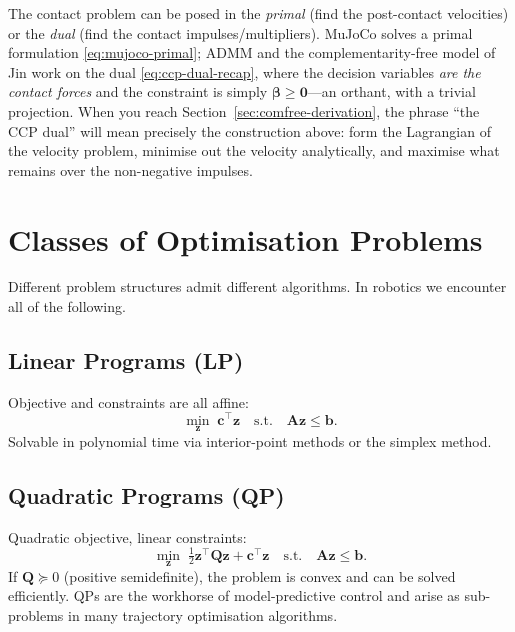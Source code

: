 \documentclass[11pt,twoside]{report}
\theoremstyle{definition}
\theoremstyle{plain}
\theoremstyle{remark}
\newcommand{\0}{\bm{0}}
\begin{document}
\begin{insightbox}
The contact problem can be posed in the \emph{primal} (find the
post-contact velocities) or the \emph{dual} (find the contact
impulses/multipliers). MuJoCo solves a primal formulation
\eqref{eq:mujoco-primal}; ADMM and the complementarity-free model of
Jin work on the dual \eqref{eq:ccp-dual-recap}, where the decision
variables \emph{are the contact forces} and the constraint is simply
$\bm{\beta}\ge\0$---an orthant, with a trivial projection.
When you reach Section~\ref{sec:comfree-derivation}, the phrase
``the CCP dual'' will mean precisely the construction above: form the
Lagrangian of the velocity problem, minimise out the velocity
analytically, and maximise what remains over the non-negative impulses.
\end{insightbox}

\section{Classes of Optimisation Problems}
\label{sec:opt-classes}

Different problem structures admit different algorithms.  In robotics we encounter all of the following.

\subsection{Linear Programs (LP)}
Objective and constraints are all affine:
\begin{equation}
\min_{\bm{z}}\;\bm{c}^{\!\top}\bm{z}\quad\text{s.t.}\quad
\bm{A}\bm{z}\le\bm{b}.
\end{equation}
Solvable in polynomial time via interior-point methods or the simplex method.

\subsection{Quadratic Programs (QP)}
Quadratic objective, linear constraints:
\begin{equation}\label{eq:qp}
\min_{\bm{z}}\;\tfrac12\bm{z}^{\!\top}\bm{Q}\bm{z}+\bm{c}^{\!\top}\bm{z}
\quad\text{s.t.}\quad\bm{A}\bm{z}\le\bm{b}.
\end{equation}
If $\bm{Q}\succeq 0$ (positive semidefinite), the problem is convex and can
be solved efficiently.  QPs are the workhorse of model-predictive control
and arise as sub-problems in many trajectory optimisation algorithms.
\end{document}
